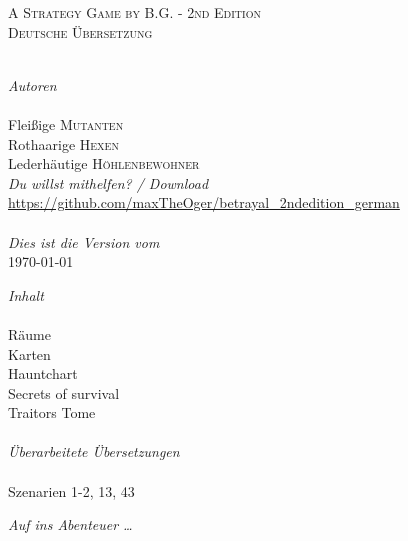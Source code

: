 \begin{titlepage}
\begin{center}
\textsc{A Strategy Game by B.G. - 2nd Edition}\\[1.5cm]

\textsc{\Large Deutsche Übersetzung}\\[0.5cm]



\HRule \\[1.5cm]

\begin{minipage}{0.4\textwidth}
\begin{flushleft} \large
\emph{Autoren}\\
\\[0.3cm]
Fleißige \textsc{Mutanten}\\
Rothaarige \textsc{Hexen}\\
Lederhäutige \textsc{Höhlenbewohner}
\\[1.5cm]
\emph{Du willst mithelfen? / Download}
\\[0.3cm]
\url{https://github.com/maxTheOger/betrayal\_2ndedition\_german}\\
\\[1.5cm]
\emph{Dies ist die Version vom}
\\[0.3cm]
{\large \today}


\end{flushleft}
\end{minipage}
\hfill
\begin{minipage}{0.4\textwidth}
\begin{flushright} \large
\emph{Inhalt} \\
\\[0.3cm]
Räume \\
Karten \\
Hauntchart \\
Secrets of survival \\
Traitors Tome \\
\\[1.5cm]
\emph{Überarbeitete Übersetzungen}\\
\\[0.3cm]
Szenarien 1-2, 13, 43
\end{flushright}
\end{minipage}

\vfill

{\emph{Auf ins Abenteuer …}}

\end{center}

\end{titlepage}